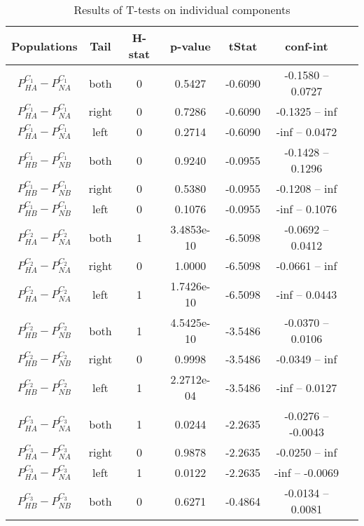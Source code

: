 \documentclass[../main.tex]{subfiles}
\begin{document}
\begin{table}
    \centering
    \caption{Results of T-tests on individual components}
        \begin{tabular}{ccccccc}
        \hline
            Populations                 & Tail   &H-stat   & p-value    & tStat & conf-int \\ 
        \hline                
            $P^{C_1}_{HA}-P^{C_1}_{NA}$    & both  & 0 & 0.5427    & -0.6090  & -0.1580 -- 0.0727 \\
            $P^{C_1}_{HA}-P^{C_1}_{NA}$    & right & 0 & 0.7286    & -0.6090  & -0.1325 -- inf    \\
            $P^{C_1}_{HA}-P^{C_1}_{NA}$    & left  & 0 & 0.2714    & -0.6090  & -inf -- 0.0472    \\
            $P^{C_1}_{HB}-P^{C_1}_{NB}$    & both  & 0 & 0.9240    & -0.0955  & -0.1428 -- 0.1296 \\
            $P^{C_1}_{HB}-P^{C_1}_{NB}$    & right & 0 & 0.5380    & -0.0955  & -0.1208 -- inf    \\
            $P^{C_1}_{HB}-P^{C_1}_{NB}$    & left  & 0 & 0.1076    & -0.0955  & -inf -- 0.1076    \\
            $P^{C_2}_{HA}-P^{C_2}_{NA}$    & both  & 1 & 3.4853e-10& -6.5098  & -0.0692 -- 0.0412 \\
            $P^{C_2}_{HA}-P^{C_2}_{NA}$    & right & 0 & 1.0000    & -6.5098  & -0.0661 -- inf    \\
            $P^{C_2}_{HA}-P^{C_2}_{NA}$    & left  & 1 & 1.7426e-10& -6.5098  & -inf -- 0.0443    \\
            $P^{C_2}_{HB}-P^{C_2}_{NB}$    & both  & 1 & 4.5425e-10& -3.5486  & -0.0370 -- 0.0106 \\
            $P^{C_2}_{HB}-P^{C_2}_{NB}$    & right & 0 & 0.9998    & -3.5486  & -0.0349 -- inf    \\
            $P^{C_2}_{HB}-P^{C_2}_{NB}$    & left  & 1 & 2.2712e-04& -3.5486  & -inf -- 0.0127    \\
            $P^{C_3}_{HA}-P^{C_3}_{NA}$    & both  & 1 & 0.0244    & -2.2635  & -0.0276 -- -0.0043\\
            $P^{C_3}_{HA}-P^{C_3}_{NA}$    & right & 0 & 0.9878    & -2.2635  & -0.0250 -- inf    \\
            $P^{C_3}_{HA}-P^{C_3}_{NA}$    & left  & 1 & 0.0122    & -2.2635  & -inf -- -0.0069  \\
            $P^{C_3}_{HB}-P^{C_3}_{NB}$    & both  & 0 & 0.6271    & -0.4864  & -0.0134 -- 0.0081  \\

\end{tabular}
\end{table}
\end{document}
